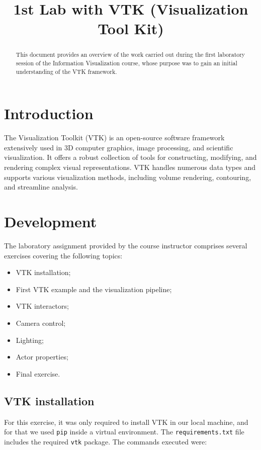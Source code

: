 \documentclass[10pt,conference]{IEEEtran}
\title{1st Lab with VTK (Visualization Tool Kit)}
\author{
\IEEEauthorblockN{João Varela, 113780}
\IEEEauthorblockN{Carolina Prata, 114246}
\IEEEauthorblockA{Information Visualization, 2025\\
MSc in Computer Engineering, University of Aveiro}
}
\begin{document}
\maketitle

\begin{abstract}
This document provides an overview of the work carried out during the first laboratory session of the Information Visualization course, whose purpose was to gain an initial understanding of the VTK framework.
\end{abstract}

\section{Introduction}
The Visualization Toolkit (VTK) is an open-source software framework extensively used in 3D computer graphics, image processing, and scientific visualization. It offers a robust collection of tools for constructing, modifying, and rendering complex visual representations. VTK handles numerous data types and supports various visualization methods, including volume rendering, contouring, and streamline analysis.

\section{Development}

The laboratory assignment provided by the course instructor comprises several exercises covering the following topics:

\begin{itemize}
    \item VTK installation;
    \item First VTK example and the visualization pipeline;
    \item VTK interactors;
    \item Camera control;
    \item Lighting;
    \item Actor properties;
    \item Final exercise.
\end{itemize}


\subsection{VTK installation}
For this exercise, it was only required to install VTK in our local machine, and for that we used \texttt{pip} inside a virtual environment. The \texttt{requirements.txt} file includes the required \texttt{vtk} package.
The commands executed were:
\end{document}
